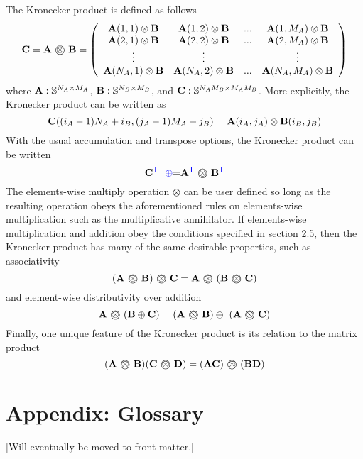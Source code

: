 The Kronecker product is defined as follows
  $$
    {\bf C} = {\bf A} ~ \text{\textcircled{$\otimes$}} ~ {\bf B} = \left(
     \begin{array}{cccc}
        {\bf A}(1,1) \otimes {\bf B} & {\bf A}(1,2) \otimes {\bf B} & ... & {\bf A}(1,M_A) \otimes {\bf B} \\
        {\bf A}(2,1) \otimes {\bf B} & {\bf A}(2,2) \otimes {\bf B} & ... & {\bf A}(2,M_A) \otimes {\bf B} \\
         \vdots   &  \vdots   &     & \vdots \\
        {\bf A}(N_A,1) \otimes {\bf B} & {\bf A}(N_A,2) \otimes {\bf B} & ... & {\bf A}(N_A,M_A) \otimes {\bf B} \\
     \end{array}  \right)
  $$
where ${\bf A} : {\mathbb S}^{N_A \times M_A}$, ${\bf B} : {\mathbb S}^{N_B \times M_B}$, and
${\bf C} : {\mathbb S}^{N_A M_B \times M_A M_B}$.  More explicitly, the Kronecker product can be written as
  $$
    {\bf C}((i_A-1) N_A + i_B,(j_A-1) M_A + j_B) = {\bf A}(i_A,j_A) \otimes {\bf B}(i_B,j_B)
  $$
With the usual accumulation and transpose options, the Kronecker product can be written
  $$
    {\bf C}^{\textcolor{blue}{\sf T}} ~~ {\textcolor{blue}{\oplus}}{=} {\bf A}^{\textcolor{blue}{\sf T}} ~ \text{\textcircled{$\otimes$}} ~ {\bf B}^{\textcolor{blue}{\sf T}}
  $$
The elements-wise multiply operation $\otimes$ can be user defined so long as the resulting operation obeys the aforementioned rules on elements-wise multiplication such as the multiplicative annihilator.  If  elements-wise multiplication and addition obey the conditions specified in section 2.5, then the Kronecker product has many of the same desirable properties, such as associativity
  $$
    ({\bf A} ~ \text{\textcircled{$\otimes$}} ~ {\bf B}) ~ \text{\textcircled{$\otimes$}} ~ {\bf C} = 
    {\bf A} ~ \text{\textcircled{$\otimes$}} ~ ({\bf B} ~ \text{\textcircled{$\otimes$}} ~ {\bf C})
  $$
and element-wise distributivity over addition
 $$
    {\bf A} ~ \text{\textcircled{$\otimes$}} ~ ({\bf B} \oplus {\bf C}) = 
    ({\bf A} ~ \text{\textcircled{$\otimes$}} ~ {\bf B}) \oplus ~ ({\bf A} ~ \text{\textcircled{$\otimes$}} ~ {\bf C})
  $$
Finally, one unique feature of the Kronecker product is its relation to the matrix product
  $$
    ({\bf A} ~ \text{\textcircled{$\otimes$}} ~ {\bf B}) ({\bf C} ~ \text{\textcircled{$\otimes$}} ~ {\bf D})
     = 
     ({\bf A} {\bf C}) ~ \text{\textcircled{$\otimes$}} ~ ({\bf B} {\bf D})
   $$

\section{Appendix: Glossary}
  [Will eventually be moved to front matter.]

